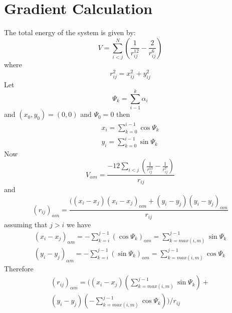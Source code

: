 \documentclass[conference,letterpaper]{IEEEtran}
\begin{document}
\clearpage



\clearpage

%
%
\appendices
\section{Gradient Calculation}
The total energy of the system is given by:
\begin{equation}
    V = \sum_{i<j}^{N}(\frac{1}{r_{ij}^{12}} - \frac{2}{r_{ij}^{6}})
\end{equation}
where
\begin{equation}
    r^{2}_{ij} = x^{2}_{ij} + y^{2}_{ij}
\end{equation}
Let
\begin{equation}
    \Psi_{k}=\sum_{i-1}^{k}\alpha_{i}
\end{equation}
and $(x_{0}, y_{0})=(0,0)$ and $\Psi_{0}=0$ then
\begin{equation}
    \begin{split}
        x_{i} = \sum_{k=0}^{i-1}\cos{\Psi_{k}} \\
        y_{i} = \sum_{k=0}^{i-1}\sin{\Psi_{k}}
    \end{split}
\end{equation}
Now
\begin{equation}
    V_{\alpha m} = \frac{-12 \sum_{i < j} (\frac{1}{r_{ij}^{13}} - \frac{1}{r_{ij}^{7}})}{r_{ij}}
\end{equation}
and
\begin{equation}
    (r_{ij})_{\alpha m} = \frac{((x_{i} - x_{j})(x_{i} - x_{j})_{\alpha m} + (y_{i} - y_{j})(y_{i} - y_{j})_{\alpha m}}{r_{ij}}
\end{equation}
assuming that $j > i$ we have
\begin{equation}
    \begin{split}
        (x_{i} - x_{j})_{\alpha m} = -\sum_{k=i}^{j-1}(\cos{\Psi_{k}})_{\alpha m} = \sum_{k=max(i,m)}^{j-1} \sin{\Psi_{k}} \\
        (y_{i} - y_{j})_{\alpha m} = -\sum_{k=i}^{j-1}(\sin{\Psi_{k}})_{\alpha m} = \sum_{k=max(i,m)}^{j-1} \cos{\Psi_{k}}
    \end{split}
\end{equation}
Therefore
\begin{equation}
    \begin{split}
        (r_{ij})_{\alpha m} = ((x_{i}-x_{j})(\sum_{k=max(i,m)}^{j-1}\sin{\Psi_{k}}) +\\
        (y_{i}-y_{j})(-\sum_{k=max(i, m)}^{j-1}\cos{\Psi_{k}}))/r_{ij}
    \end{split}
\end{equation}
\end{document}
